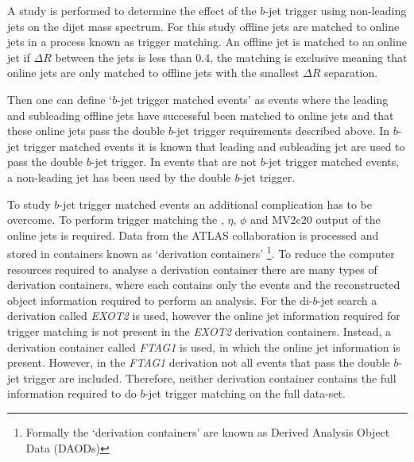 A study is performed to determine the effect of the $b$-jet trigger using non-leading jets on the dijet mass spectrum.
For this study offline jets are matched to online jets in a process known as trigger matching.
An offline jet is matched to an online jet if $\Delta R$
between the jets is less than 0.4,
the matching is exclusive meaning that online jets are only matched to offline jets with the smallest $\Delta R$ separation.
%
%
%

Then one can define `$b$-jet trigger matched events' as events where
the leading and subleading offline jets have successful been matched to online jets
and that these online jets pass the double $b$-jet trigger requirements described above.
In $b$-jet trigger matched events it is known that leading and subleading jet are used to pass the double $b$-jet trigger.
In events that are not $b$-jet trigger matched events, a non-leading jet has been used by the double $b$-jet trigger.

To study $b$-jet trigger matched events an additional complication has to be overcome.
To perform trigger matching the \pT, $\eta$, $\phi$ and MV2c20 output of the online jets is required.
Data from the ATLAS collaboration is processed and stored in containers known as `derivation containers'
\footnote{Formally the `derivation containers' are known as Derived Analysis Object Data (DAODs)}.
To reduce the computer resources required to analyse a derivation container
there are many types of derivation containers,
where each contains only the events and the reconstructed object information required to perform an analysis.
For the di-$b$-jet search a derivation called \textit{EXOT2} is used,
however the online jet information required for trigger matching is not present in the \textit{EXOT2} derivation containers.
Instead, a derivation container called \textit{FTAG1} is used, in which the online jet information is present.
However, in the \textit{FTAG1} derivation not all events that pass the double $b$-jet trigger are included.
Therefore, neither derivation container contains the full information required to do $b$-jet trigger matching on the full \lm{} data-set.

